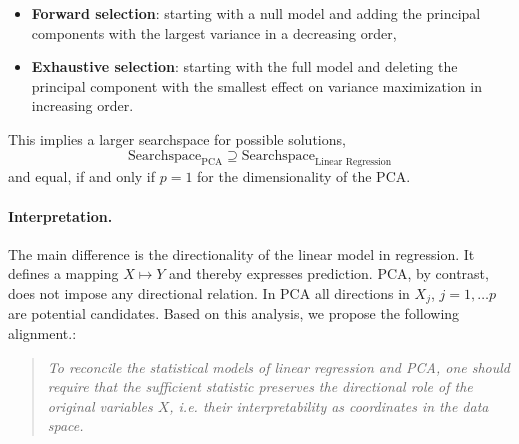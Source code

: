 \begin{itemize}
    \item \textbf{Forward selection}: starting with a null model and adding the principal components with the largest variance in a decreasing order,
    \item \textbf{Exhaustive selection}: starting with the full model and deleting the principal component with the smallest effect on variance maximization in increasing order.
\end{itemize}

This implies a larger searchspace for possible solutions, 
\[ \text{Searchspace}_{\text{PCA}} \supseteq \text{Searchspace}_{\text{Linear Regression}} \]
and equal, if and only if $p=1$ for the dimensionality of the PCA.

\paragraph{Interpretation.}
The main difference is the directionality of the linear model in regression. It defines a mapping $X \mapsto Y$ and thereby expresses prediction. PCA, by contrast, does not impose any directional relation. In PCA all directions in $X_j$, $j = 1, \dots p$ are potential candidates. Based on this analysis, we propose the following alignment.:

\begin{quote}
\textit{To reconcile the statistical models of linear regression and PCA, one should require that the sufficient statistic preserves the directional role of the original variables $X$, i.e. their interpretability as coordinates in the data space.}
\end{quote}
